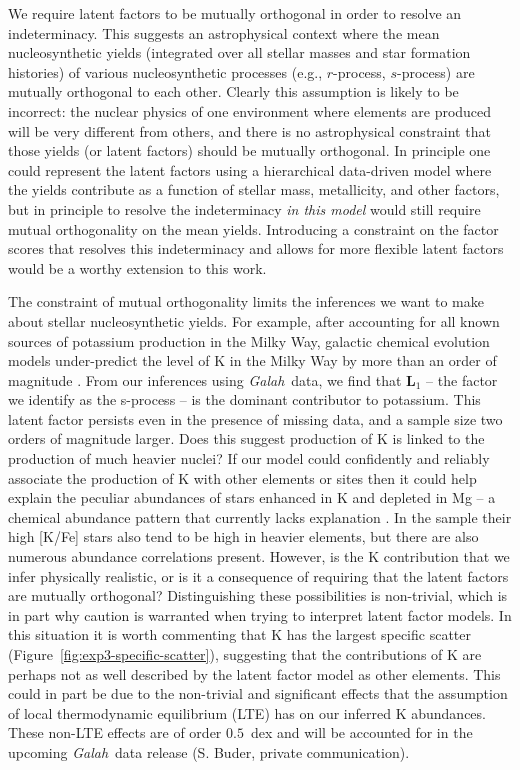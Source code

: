\documentclass[twocolumn]{aastex62}
\newcommand{\project}[1]{\textsl{#1}}
\newcommand{\Galah}{\project{Galah}}
\newcommand{\factorloads}{\textbf{L}}
\begin{document}
We require latent factors to be mutually orthogonal in order to resolve
an indeterminacy. This suggests an astrophysical context where 
the mean nucleosynthetic yields (integrated over all stellar masses and star
formation histories) of various nucleosynthetic processes (e.g., $r$-process, 
$s$-process) are mutually orthogonal to each other. Clearly this assumption 
is likely to be incorrect: the nuclear physics
of one environment where elements are produced will be very different from
others, and there is no astrophysical constraint that those
yields (or latent factors) should be mutually orthogonal.
In principle one could represent the latent factors using a hierarchical data-driven model where the yields contribute as a function of stellar mass, 
metallicity, and other factors, but in principle to resolve the indeterminacy
\emph{in this model} would still require mutual orthogonality on the mean yields. Introducing a constraint on the factor scores that resolves this indeterminacy and allows for more flexible latent factors would be a worthy extension to this work.


The constraint of mutual orthogonality limits the inferences we want to make
about stellar nucleosynthetic yields. For example, after accounting for all
known sources of potassium production in the Milky Way, galactic chemical evolution
models under-predict the level of K in the Milky Way by more than an
order of magnitude \citep{Kobayashi:2006}. From our inferences 
using \Galah\ data, we find that $\factorloads_1$ -- the factor we identify as the s-process --  is the dominant contributor to
potassium. This latent factor persists even in the presence of missing data, and
a sample size two orders of magnitude larger.
Does this
suggest production of K is linked to the production of much heavier nuclei?
If our model could confidently and
reliably associate the production of K with other elements or sites then it could help explain the peculiar abundances of stars enhanced in
K and depleted in Mg \citep{Mucciarelli:2012,Cohen:2012} -- a chemical
abundance pattern that currently lacks explanation \citep{Iliadis:2016,Kemp:2018}.
In the \citet{Cohen:2012} sample their high [K/Fe] stars also tend
to be high in heavier elements, but there
are also numerous abundance correlations present.
However, is the K contribution that we infer physically realistic,
or is it a consequence of requiring that the latent factors are mutually
orthogonal? Distinguishing these possibilities is non-trivial, which is in
part why caution is warranted when trying to interpret latent factor models.
In this situation it is worth commenting that K has the largest specific
scatter (Figure~\ref{fig:exp3-specific-scatter}), suggesting that the contributions
of K are perhaps not as well described by the latent factor model as other
elements. This could in part be due to the non-trivial and significant effects
that the assumption of local thermodynamic equilibrium (LTE) has on our inferred K
abundances. These non-LTE effects are of order $0.5$~dex and will be accounted for in the upcoming \Galah\ data release (S. Buder, private communication).
\end{document}
